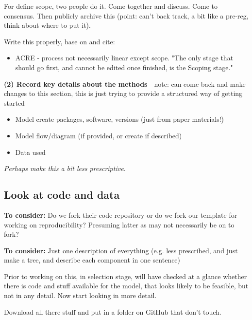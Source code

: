 For define scope, two people do it. Come together and discuss. Come to consensus. Then publicly archive this (point: can't back track, a bit like a pre-reg, think about where to put it).

Write this properly, base on and cite:
\begin{itemize}
    \item ACRE - process not necessarily linear except scope. "The only stage that should go first, and cannot be edited once finished, is the Scoping stage."\cite{berkeley_initiative_for_transparency_in_the_social_sciences_guide_2022}
\end{itemize}

\textbf{(2) Record key details about the methods} - note: can come back and make changes to this section, this is just trying to provide a structured way of getting started
\begin{itemize}
    \item Model create packages, software, versions (just from paper materials!)
    \item Model flow/diagram (if provided, or create if described)
    \item Data used
\end{itemize}

\textit{Perhaps make this a bit less prescriptive.}

\subsection{Look at code and data} 


\textbf{To consider:} Do we fork their code repository or do we fork our template for working on reproducibility? Presuming latter as may not necessarily be on to fork?

\textbf{To consider:} Just one description of everything (e.g. less prescribed, and just make a tree, and describe each component in one sentence)

Prior to working on this, in selection stage, will have checked at a glance whether there is code and stuff available for the model, that looks likely to be feasible, but not in any detail. Now start looking in more detail.

Download all there stuff and put in a folder on GitHub that don't touch.

